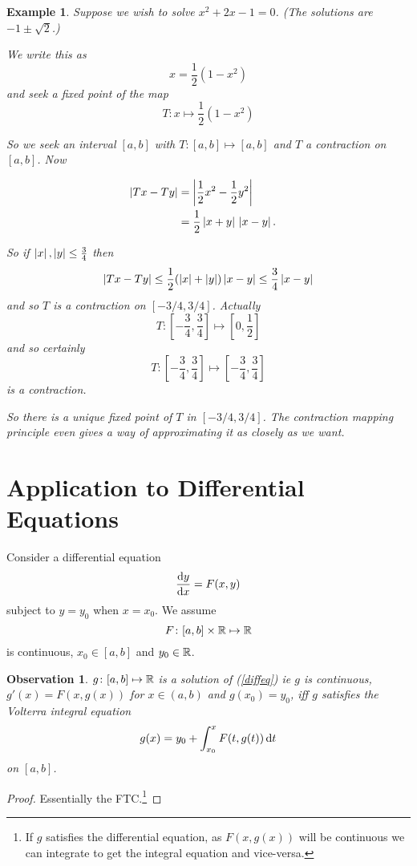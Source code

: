 \documentclass{notes}
\theoremstyle{plain}
\newtheorem{observation}[proposition]{Observation}
\newtheorem{example}[proposition]{Example}
\begin{document}
\begin{example}
Suppose we wish to solve $x^{2}+2x-1=0$. (The solutions are $ -1 
\pm \sqrt{2} $.)

We write this as \[ x = \frac{1}{2}(1-x^{2}) \] and seek a fixed 
point of the map \[ T: x \mapsto \frac{1}{2}(1-x^{2}) \]

So we seek an interval $ [a,b] $ with $ T\colon [a,b] \mapsto [a,b] 
$ and $ T $ a contraction on $ [a,b] $.
Now

\begin{align*}
\left|Tx-Ty\right| & = \left| \frac{1}{2}x^{2}-\frac{1}{2}y^{2}\right| \cr
& = \frac{1}{2} \left|x+y\right| \, \left|x-y\right|.
\end{align*}

So if $\left|x\right|, \left|y\right| \leq \frac{3}{4}$ then
\[ \left|Tx-Ty\right| \leq \frac{1}{2}(\left|x\right|+\left|y\right|) \left|x-y\right| \leq 
\frac{3}{4} \left|x-y\right| \] and so $ T $ is a contraction on $ 
[-3/4,3/4] $.
Actually
\[ T\colon  \left[ -\frac{3}{4}, \frac{3}{4} \right] \mapsto 
\left[ 0, \frac{1}{2} \right] \] and so certainly
\[ T\colon  \left[ -\frac{3}{4}, \frac{3}{4} \right]
\mapsto \left[ -\frac{3}{4}, \frac{3}{4} \right] 
\] is a contraction.

So there is a unique fixed point of $ T $ in $ [-3/4,3/4] $.  The
contraction mapping principle even gives a way of approximating it as
closely as we want.
\end{example}

\section{Application to Differential Equations}\label{s7.2}

Consider a differential equation
\begin{equation}
\label{diffeq}
\frac{\mathrm{d} y}{\mathrm{d} x} = F(x,y)
\end{equation}
subject to $ y=y_{0} $ when $ x=x_{0} $.
We assume
\[ F\colon [a,b] \times \mathbb{R} \mapsto \mathbb{R}
\] is continuous, $ x_{0} \in [a,b] $ and $ y_{0} \in \mathbb{R} $.

\begin{observation}
$ g\colon [a,b] \mapsto \mathbb{R} $ is a solution of (\ref{diffeq}) ie $ g 
$ is continuous, $g'(x) = F(x,g(x))$ for $ x \in (a,b) $ and 
$ g(x_{0})=y_{0} $, iff $ g $ satisfies the Volterra integral 
equation
\[ g(x) = y_{0} + \int_{x_{0}}^{x} F(t,g(t))\,\mathrm{d} t \]
on $ [a,b] $.
\end{observation}

\begin{proof}
Essentially the FTC.\footnote{If $ g $ satisfies the differential 
equation, as $ F(x,g(x)) $ will be continuous we can integrate to 
get the integral equation and vice-versa.}
\end{proof}
\end{document}
